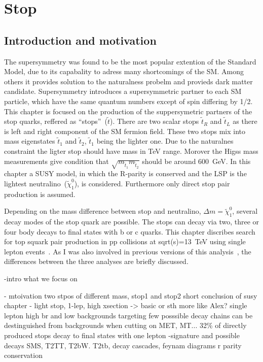 \chapter{Stop}

\section{Introduction and motivation}

The supersymmetry was found to be the most popular extention of the Standard Model, due to its capabality to adress many shortcomings of the SM. Among others it provides solution to the naturalness probelm and provieds dark matter candidate. Supersymmetry introduces a supersymmetric partner to each SM particle, which have the same quantum numbers except of spin differing by 1/2. This chapter is focused on the production of the suppersymetric partners of the stop quarks, reffered as ``stops''~($\tilde{t}$). There are two scalar stops $\tilde{t}_{R}$ and  $\tilde{t}_{L}$ as there is left and right component of the SM fermion field. These two stops mix into mass eigenstates $\tilde{t}_{1}$ and $\tilde{t}_{2}$,  $\tilde{t}_{1}$ being the lighter one. Due to the naturalnes constraint the ligter stop should have mass in TeV range. Morover the Higss mass measurements give condition that $\sqrt{m_{\tilde{t}_{1}} m_{\tilde{t}_{2}}}$ should be around 600~GeV. In this chapter a SUSY model, in which the R-parity is conserved and the LSP is the lightest neutralino~($\tilde{\chi}^{0}_{1}$), is considered. Furthermore only direct stop pair production is assumed.

Depending on the mass difference between stop and neutralino, $\Delta m =  \tilde{\chi}^{0}_{1}$, several decay modes of the stop quark are possible. The stops can decay via two, three or four body decays to final states with b or c quarks. This chapter discribes search for top squark pair production in pp collisions at sqrt(s)=13~TeV using single lepton events~\cite{Sirunyan:2017xse}. As I was also involved in previous versions of this analysis~\cite{Sirunyan:2016jpr, CMS:2016vew}, the differences between the three analyses are briefly discussed.



-intro what we focus on

- mtoivation
	two stpos of different mass, stop1 and stop2
	short conclusion of susy chapter - light stop, 1-lep, high xsection -> basic or sth more like Alex?
	single lepton high br and low backgrounds
	targeting few posssible decay chains
	can be destinguished from backgrounds when cutting on MET, MT...
	32\% of directly produced stops decay to final states with one lepton
-signature  and possible decays
	SMS, T2TT, T2bW. T2tb, decay cascades, feynam diagrams
	r parity conservation
	

